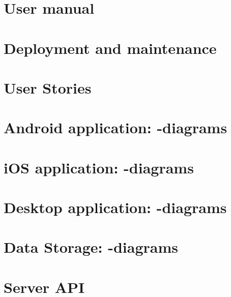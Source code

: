 \begin{appendix}

\chapter{User manual}


\chapter{Deployment and maintenance}


\chapter{User Stories}

\newpage
\FloatBarrier
\chapter{Android application: -diagrams}


\newpage
\FloatBarrier
\vspace*{4cm}
\chapter{iOS application: -diagrams}


\newpage
\vspace*{4cm}
\chapter{Desktop application: -diagrams}
\label{chap:des_appendix}


\chapter{Data Storage: -diagrams}
\label{chap:dat_umls}


\chapter{Server API}


%
\begin{comment}
%


\end{comment}
\end{appendix}
